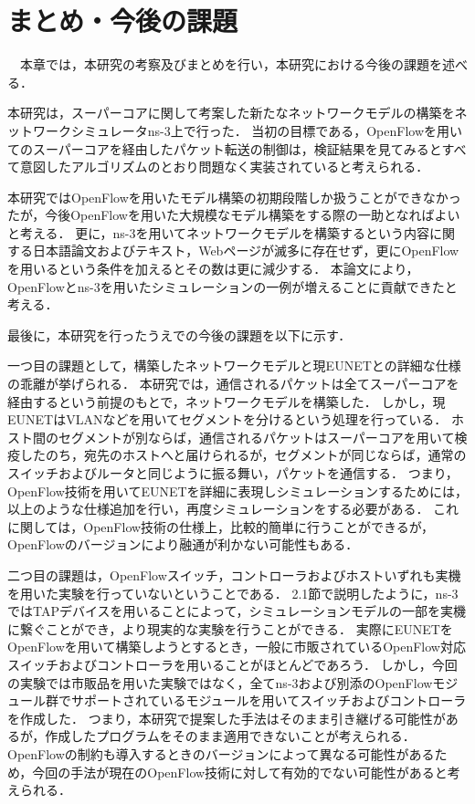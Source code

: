 \chapter{まとめ・今後の課題}

　本章では，本研究の考察及びまとめを行い，本研究における今後の課題を述べる．

本研究は，スーパーコアに関して考案した新たなネットワークモデルの構築をネットワークシミュレータns-3上で行った．
当初の目標である，OpenFlowを用いてのスーパーコアを経由したパケット転送の制御は，検証結果を見てみるとすべて意図したアルゴリズムのとおり問題なく実装されていると考えられる．

本研究ではOpenFlowを用いたモデル構築の初期段階しか扱うことができなかったが，今後OpenFlowを用いた大規模なモデル構築をする際の一助となればよいと考える．
更に，ns-3を用いてネットワークモデルを構築するという内容に関する日本語論文およびテキスト，Webページが滅多に存在せず，更にOpenFlowを用いるという条件を加えるとその数は更に減少する．
本論文により，OpenFlowとns-3を用いたシミュレーションの一例が増えることに貢献できたと考える．

最後に，本研究を行ったうえでの今後の課題を以下に示す．

一つ目の課題として，構築したネットワークモデルと現EUNETとの詳細な仕様の乖離が挙げられる．
本研究では，通信されるパケットは全てスーパーコアを経由するという前提のもとで，ネットワークモデルを構築した．
しかし，現EUNETはVLANなどを用いてセグメントを分けるという処理を行っている．
ホスト間のセグメントが別ならば，通信されるパケットはスーパーコアを用いて検疫したのち，宛先のホストへと届けられるが，セグメントが同じならば，通常のスイッチおよびルータと同じように振る舞い，パケットを通信する．
つまり，OpenFlow技術を用いてEUNETを詳細に表現しシミュレーションするためには，以上のような仕様追加を行い，再度シミュレーションをする必要がある．
これに関しては，OpenFlow技術の仕様上，比較的簡単に行うことができるが，OpenFlowのバージョンにより融通が利かない可能性もある．

二つ目の課題は，OpenFlowスイッチ，コントローラおよびホストいずれも実機を用いた実験を行っていないということである．
2.1節で説明したように，ns-3ではTAPデバイスを用いることによって，シミュレーションモデルの一部を実機に繋ぐことができ，より現実的な実験を行うことができる．
実際にEUNETをOpenFlowを用いて構築しようとするとき，一般に市販されているOpenFlow対応スイッチおよびコントローラを用いることがほとんどであろう．
しかし，今回の実験では市販品を用いた実験ではなく，全てns-3および別添のOpenFlowモジュール群でサポートされているモジュールを用いてスイッチおよびコントローラを作成した．
つまり，本研究で提案した手法はそのまま引き継げる可能性があるが，作成したプログラムをそのまま適用できないことが考えられる．
OpenFlowの制約も導入するときのバージョンによって異なる可能性があるため，今回の手法が現在のOpenFlow技術に対して有効的でない可能性があると考えられる．